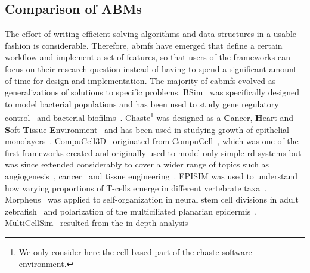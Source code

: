 \subsection{Comparison of ABMs}\noindent
\label{subsec:abms-comparison-of-abms}\noindent
The effort of writing efficient solving algorithms and data structures in a usable
fashion is considerable.
Therefore, \acp{abmf} have emerged that define a certain workflow and implement a set of
features, so that users of the frameworks can focus on their research question instead of
having to spend a significant amount of time for design and implementation.
\newline
%
The majority of \acp{cabmf} evolved as generalizations of solutions to specific problems.
BSim~\cite{Gorochowski2012} was specifically designed to model
bacterial populations and has been used to study gene regulatory
control~\cite{Martinelli2022} and bacterial biofilms~\cite{Jin2020}.
Chaste\footnote{We only consider here the cell-based part of the chaste software
environment.} was designed as a \textbf{C}ancer, \textbf{H}eart and \textbf{S}oft
\textbf{T}issue \textbf{E}nvironment~\cite{Cooper2020} and has been used
in studying growth of epithelial monolayers~\cite{Dunn2012}.
CompuCell3D~\cite{Swat2012} originated from
CompuCell~\cite{Izaguirre2004}, which was one of the first
frameworks created and originally used to model only simple \ac{rd} systems but was since
extended considerably to cover a wider range of topics such as
angiogenesis~\cite{Nivlouei2021},
cancer~\cite{Asadullah2021} and tissue engineering~\cite{Moldovan2021}.
EPISIM was used to understand how varying proportions of T-cells emerge in different
vertebrate taxa~\cite{Aghaallaei2021}.
Morpheus~\cite{Starruss2014} was applied to self-organization
in neural stem cell divisions in adult
zebrafish~\cite{Mulberry2020} and polarization of the
multiciliated planarian epidermis~\cite{Vu2019}.
MultiCellSim~\cite{Dang2020} resulted from the in-depth analysis
